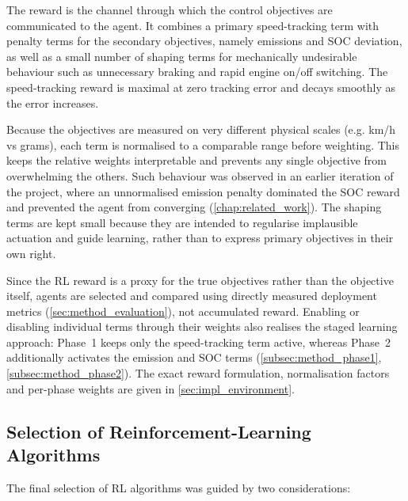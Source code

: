 The reward is the channel through which the control objectives are communicated to the agent. It combines a primary speed-tracking term with penalty terms for the secondary objectives, namely emissions and \ac{SOC} deviation, as well as a small number of shaping terms for mechanically undesirable behaviour such as unnecessary braking and rapid engine on/off switching. The speed-tracking reward is maximal at zero tracking error and decays smoothly as the error increases.

Because the objectives are measured on very different physical scales (e.g. km/h vs grams), each term is normalised to a comparable range before weighting. This keeps the relative weights interpretable and prevents any single objective from overwhelming the others. Such behaviour was observed in an earlier iteration of the project, where an unnormalised emission penalty dominated the \ac{SOC} reward and prevented the agent from converging (\autoref{chap:related_work}). The shaping terms are kept small because they are intended to regularise implausible actuation and guide learning, rather than to express primary objectives in their own right.

Since the \ac{RL} reward is a proxy for the true objectives rather than the objective itself, agents are selected and compared using directly measured deployment metrics (\autoref{sec:method_evaluation}), not accumulated reward. Enabling or disabling individual terms through their weights also realises the staged learning approach: Phase~1 keeps only the speed-tracking term active, whereas Phase~2 additionally activates the emission and \ac{SOC} terms (\autoref{subsec:method_phase1}, \autoref{subsec:method_phase2}). The exact reward formulation, normalisation factors and per-phase weights are given in \autoref{sec:impl_environment}.

\subsection{Selection of Reinforcement-Learning Algorithms}
\label{subsec:method_algo_selection}

The final selection of \ac{RL} algorithms was guided by two considerations:

